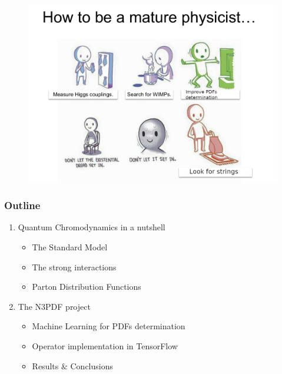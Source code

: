 \documentclass[aspectratio=43]{beamer}
\begin{document}
\begin{frame}

	\begin{figure}
		\includegraphics[width = \linewidth]{joke3.png}
	\end{figure}

\end{frame}

\begin{frame}

	\frametitle{Outline}
	
	\begin{enumerate}
		\item {\color{blue}Quantum Chromodynamics in a nutshell}
		\begin{itemize}
			\item The Standard Model
			\item The strong interactions
			\item Parton Distribution Functions
		\end{itemize}
		\item {\color{blue}The N3PDF project}
		\begin{itemize}
			\item Machine Learning for PDFs determination
			\item Operator implementation in TensorFlow
			\item Results $\&$ Conclusions
		\end{itemize}
	\end{enumerate}
	
\end{frame}

\begin{frame}
	

\end{frame}
\end{document}
